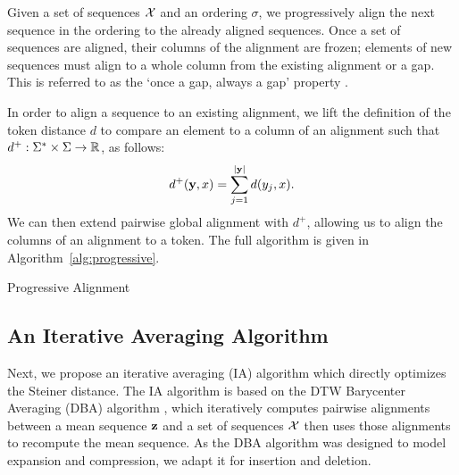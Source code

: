 \documentclass{article}
\begin{document}
Given a set of sequences $\mathcal{X}$ and an ordering $\sigma$,
we progressively align the next sequence in the ordering to the
already aligned sequences.
Once a set of sequences are aligned, their columns of the alignment are frozen;
elements of new sequences must align to a whole column
from the existing alignment or a gap.
This is referred to as the `once a gap, always a gap' property \citep{fengdoolittle}.

In order to align a sequence to an existing alignment, we lift the definition of
the token distance $d$ to compare an element to a column of an alignment 
such that $d^+: \Sigma^*\times\Sigma\to\mathbb{R}$, as follows:
\begin{equation}
\label{eqn:dplus}
d^+(\mathbf{y}, x) = \sum_{j=1}^{|\mathbf{y}|} d(y_j, x).
\end{equation}
We can then extend pairwise global alignment with $d^+$, allowing us to
align the columns of an alignment to a token.
The full algorithm is given in Algorithm~\ref{alg:progressive}.

\begin{algorithm}[h]
\begin{algorithmic}
\EndFor
{}
\end{algorithmic}
\caption{\label{alg:progressive}
Progressive Alignment
}
\end{algorithm}

%

\subsection{An Iterative Averaging Algorithm}
Next, we propose an iterative averaging (IA)
algorithm which directly optimizes the Steiner distance.
The IA algorithm is based on the
DTW Barycenter Averaging (DBA) algorithm \citep{petitjean2011dba},
which iteratively computes pairwise alignments between a mean sequence $\mathbf{z}$
and a set of sequences $\mathcal{X}$ then uses those alignments to recompute the mean sequence. 
As the DBA algorithm was designed to model expansion and compression, 
we adapt it for insertion and deletion.
\end{document}
